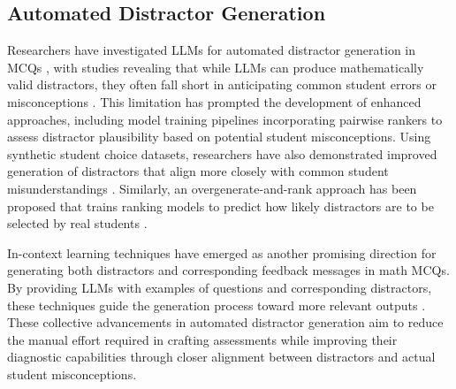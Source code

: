 \subsection{Automated Distractor Generation}

Researchers have investigated LLMs for automated distractor generation in MCQs \cite{baral2024automated,eedi-mining-misconceptions-in-mathematics,bitew2023distractor}, with studies revealing that while LLMs can produce mathematically valid distractors, they often fall short in anticipating common student errors or misconceptions \cite{feng2024exploring}. This limitation has prompted the development of enhanced approaches, including model training pipelines incorporating pairwise rankers to assess distractor plausibility based on potential student misconceptions. Using synthetic student choice datasets, researchers have also demonstrated improved generation of distractors that align more closely with common student misunderstandings \cite{lee2025generating}. Similarly, an overgenerate-and-rank approach has been proposed that trains ranking models to predict how likely distractors are to be selected by real students \cite{scarlatos2024improving}.

In-context learning techniques have emerged as another promising direction for generating both distractors and corresponding feedback messages in math MCQs. By providing LLMs with examples of questions and corresponding distractors, these techniques guide the generation process toward more relevant outputs \cite{mcnichols2023automated}. These collective advancements in automated distractor generation aim to reduce the manual effort required in crafting assessments while improving their diagnostic capabilities through closer alignment between distractors and actual student misconceptions. 
